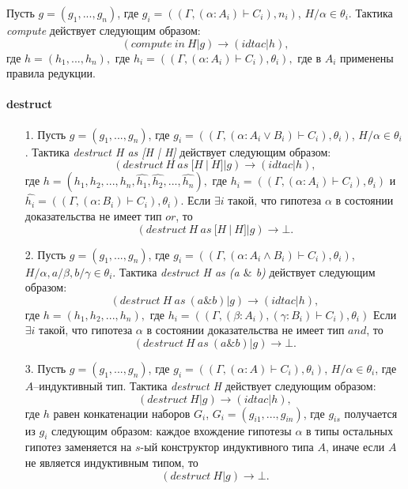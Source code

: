 \documentclass[12pt]{article}
\begin{document}
Пусть $g = (g_1, ..., g_n)$, где $g_i = ((\Gamma, (\alpha: A_i) \vdash C_i), n_i)$, $H/\alpha \in \theta_i$.
Тактика \textit{compute} действует следующим образом:
$$(compute\ in\ H|g) \xrightarrow{} (idtac| h),$$
где $h=(h_1, ...,h_n),$ где $h_i= ((\Gamma, (\alpha: A_i) \vdash C_i ), \theta_i),$ где в $A_i$ применены правила редукции.

\paragraph{destruct}

\begin{enumerate}
    \item[1.] Пусть $g = (g_1, ..., g_n)$, где $g_i = ((\Gamma, (\alpha:A_i \vee B_i) \vdash C_i ), \theta_i)$, $H/\alpha \in \theta_i$.
    Тактика \textit{destruct H as [H | H]} действует следующим образом:
$$(destruct\ H\ as\ [H\ |\ H]|g) \xrightarrow{} (idtac| h),$$
где $h=(h_1,h_2,...,h_n,\hat{h_1},\hat{h_2},...,\hat{h_n}),$ где $h_i= ((\Gamma, (\alpha:A_i) \vdash C_i), \theta_i)$ и $\hat{h_i}= ((\Gamma, (\alpha: B_i) \vdash C_i), \theta_i).$
Если $\exists i$ такой, что гипотеза $\alpha$ в состоянии доказательства не имеет тип $or$, то
$$(destruct\ H\ as\ [H\ |\ H]|g) \xrightarrow{} \bot.$$
    \item[2.] Пусть $g = (g_1, ..., g_n)$, где $g_i = ((\Gamma, (\alpha: A_i \wedge B_i) \vdash C_i ), \theta_i)$, $H/\alpha,a/\beta,b/\gamma \in \theta_i$.
    Тактика \textit{destruct H as (a $\&$ b)} действует следующим образом:
    $$(destruct\ H\ as\ (a \& b)|g) \xrightarrow{} (idtac| h),$$
    где $h=(h_1,h_2,...,h_n),$ где $h_i= ((\Gamma, (\beta:A_i), (\gamma:B_i) \vdash C_i), \theta_i)$
    Если $\exists i$ такой, что гипотеза $\alpha$ в состоянии доказательства не имеет тип $and$, то
$$(destruct\ H\ as\ (a \& b)|g) \xrightarrow{} \bot.$$
    \item[3.] Пусть $g = (g_1, ..., g_n)$, где $g_i = ((\Gamma, (\alpha:A) \vdash C_i ), \theta_i)$, $H/\alpha \in \theta_i$, где $A$--индуктивный тип. Тактика \textit{destruct H} действует следующим образом:
    $$(destruct\ H|g) \xrightarrow{} (idtac| h),$$
    где $h$ равен конкатенации наборов $G_i$, $G_i =(g_{i1}, ..., g_{in})$, где $g_{is}$ получается из $g_i$ следующим образом:
    каждое вхождение гипотезы $\alpha$ в типы остальных гипотез заменяется на $s$-ый конструктор индуктивного типа $A$, иначе если $A$ не является индуктивным типом, то
    $$(destruct\ H|g) \xrightarrow{} \bot.$$
\end{enumerate}
\end{document}
